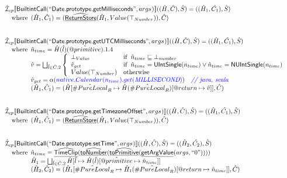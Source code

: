 \documentclass{article}
\makeatletter
\newcommand{\SF}[1]{\mbox{\textsf{#1}}}
\newcommand{\comment}[1]{\textit{#1}}
\newcommand{\wherec}[1]{{\rm where}\begin{array}[t]{l}#1\end{array}}
\newcommand{\ifc}[1]{{\rm if}\begin{array}[t]{l}#1\end{array}}
\newcommand{\owc}{{\rm otherwise}}
\newcommand{\aI}{\hat{\mathcal{I}}}
\newcommand{\lbr}{\llbracket}
\newcommand{\rbr}{\rrbracket}
\newcommand{\hf}[1]{\underline{\sf #1}}
\newcommand{\ahf}[1]{\widehat{\underline{\sf #1}}}
\newcommand{\varprop}[1]{@#1}
\newcommand{\avarloc}[1]{\hat{\##1}}
\newcommand{\avarprop}[1]{\hat{@#1}}
\def\inblue{\color{blue}}
\def\inblue{\color{blue}}
\makeatother
\begin{document}
\[
\begin{array}{l}

\aI _{cp}\lbr \SF{BuiltintCall}(``\SF{Date.prototype.getMilliseconds}",args_{})\rbr((\hat{H},\hat{C}), \hat{S})
  = ((\hat{H}_1, \hat{C_1}), \hat{S})\\
\quad\wherec{
  (\hat{H}_1, \hat{C}_1) = (\ahf{ReturnStore}(\hat{H}_1, Value(\top_{Number})), \hat{C})
  }\\
\\\\

\aI _{cp}\lbr \SF{BuiltintCall}(``\SF{Date.prototype.getUTCMilliseconds}",args_{})\rbr((\hat{H},\hat{C}), \hat{S})
  = ((\hat{H}_1, \hat{C_1}), \hat{S})\\
\quad\wherec{
  \hat{n}_{time} = \hat{H}(\hat{l})(\avarprop{primitive}).1.4\\
  \hat{v} = \bigsqcup_{\hat{l} \in \hat{C}.2} \left\{\begin{array}{ll}
      \bot_{Value} & \ifc{\hat{n}_{time} \sqsubseteq  \bot_{number}}\\
      \hat{v}_{get} &
      \ifc{\hat{n}_{time} = \SF{UIntSingle}(n_{time}) \lor\hat{n}_{time} = \SF{NUIntSingle}(n_{time}) }\\
      Value(\top_{Number}) & \owc
    \end{array}\right.\\
  \hat{v}_{get} = \alpha({\inblue native.Calendar(n_{time}).get(\emph{MILLISECOND})})
    \quad\comment{{\inblue // java, scala}}\\  
  (\hat{H}_1, \hat{C}_1) = 
    (\hat{H}[\avarloc{PureLocal}_R \mapsto \hat{H}(\avarloc{PureLocal}_R)
      [\varprop{return} \mapsto \hat{v}]], \hat{C})\\
  }\\
\\\\

\aI _{cp}\lbr \SF{BuiltintCall}(``\SF{Date.prototype.getTimezoneOffset}",args_{})\rbr((\hat{H},\hat{C}), \hat{S})
  = ((\hat{H}_1, \hat{C_1}), \hat{S})\\
\quad\wherec{
  (\hat{H}_1, \hat{C}_1) = (\ahf{ReturnStore}(\hat{H}_1, Value(\top_{Number})), \hat{C})
  }\\
\\\\

\aI _{cp}\lbr \SF{BuiltintCall}(``\SF{Date.prototype.setTime}",args_{})\rbr((\hat{H},\hat{C}), \hat{S})
  = ((\hat{H}_2, \hat{C_2}), \hat{S})\\
\quad\wherec{
  \hat{n}_{time} = \ahf{TimeClip}(\ahf{toNumber}(\ahf{toPrimitive}(\hf{getArgValue}(args, ``0"))))\\
  \hat{H}_1 = \bigsqcup_{\hat{l} \in \hat{C}.2} \hat{H}[\hat{l}
    \mapsto \hat{H}(\hat{l})[\avarprop{primitive} \mapsto \hat{n}_{time}]]\\
  (\hat{H}_2, \hat{C}_2) = 
    (\hat{H}_1[\avarloc{PureLocal}_R \mapsto \hat{H}_1(\avarloc{PureLocal}_R)
      [\varprop{return} \mapsto \hat{n}_{time}]], \hat{C})\\
  }\\
\\\\



\end{array}\]
\end{document}
